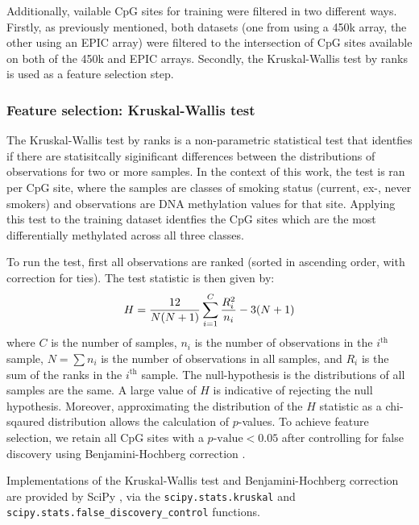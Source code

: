 \documentclass{article}
\newcommand{\equationname}[1]{%
    \begingroup
        \leavevmode
        \addcontentsline{equ}{equations}{\protect\numberline{\theequation}#1}%
    \endgroup   
}
\begin{document}
Additionally,  vailable CpG sites for training were filtered in two different ways. Firstly, as previously mentioned, both datasets (one from using a 450k array, the other using an EPIC array) were filtered to the intersection of CpG sites available on both of the 450k and EPIC arrays. Secondly, the Kruskal-Wallis test by ranks is used as a feature selection step.

\subsubsection{Feature selection: Kruskal-Wallis test} \label{sec:feature-selection}
The Kruskal-Wallis test by ranks \cite{Kruskal1952UseOR} is a non-parametric statistical test that identfies if there are statisitcally siginificant differences between the distributions of observations for two or more samples. In the context of this work, the test is ran per CpG site, where the samples are classes of smoking status (current, ex-, never smokers) and observations are DNA methylation values for that site. Applying this test to the training dataset identfies the CpG sites which are the most differentially methylated across all three classes.

To run the test, first all observations are ranked (sorted in ascending order, with correction for ties). The test statistic is then given by:
\begin{equation} \equationname{Kruskal-Wallis test by ranks}
    H = \frac{12}{N(N + 1)}\sum_{i=1}^{C}\frac{R_i^2}{n_i} - 3(N + 1)
\end{equation}
where \(C\) is the number of samples, \(n_i\) is the number of observations in the \(i^\text{th}\) sample, \(N = \sum n_i\) is the number of observations in all samples, and \(R_i\) is the sum of the ranks in the \(i^\text{th}\) sample. The null-hypothesis is the distributions of all samples are the same. A large value of \(H\) is indicative of rejecting the null hypothesis. Moreover, approximating the distribution of the \(H\) statistic as a chi-sqaured distribution allows the calculation of \(p\)-values. To achieve feature selection, we retain all CpG sites with a \(p\text{-value} < 0.05\) after controlling for false discovery using Benjamini-Hochberg correction \cite{benjamini1995controlling}.

Implementations of the Kruskal-Wallis test and Benjamini-Hochberg correction are provided by SciPy \cite{SciPy}, via the \verb|scipy.stats.kruskal| and \verb|scipy.stats.false_discovery_control| functions.
\end{document}
